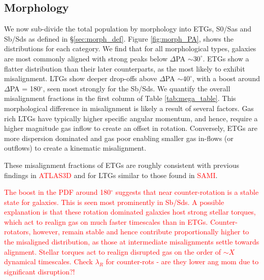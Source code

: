 \documentclass[fleqn,usenatbib]{mnras}
\newcommand{\red}[1]{{\textcolor{red}{#1}}}
\begin{document}
\subsection{Morphology}
We now sub-divide the total population by morphology into ETGs, S0/Sas and Sb/Sds as defined in \S\ref{sec:morph_def}. Figure \ref{fig:morph_PA}, shows the distributions for each category. We find that for all morphological types, galaxies are most commonly aligned with strong peaks below $\Delta$PA $\sim 30^{\circ}$. ETGs show a flatter distribution than their later counterparts, as the most likely to exhibit misalignment. LTGs show deeper drop-offs above $\Delta$PA $\sim 40^{\circ}$, with a boost around $\Delta$PA = 180$^{\circ}$, seen most strongly for the Sb/Sds. We quantify the overall misalignment fractions in the first column of Table \ref{tab:mega_table}. This morphological difference in misalignment is likely a result of several factors. Gas rich LTGs have typically higher specific angular momentum, and hence, require a higher magnitude gas inflow to create an offset in rotation. Conversely, ETGs are more dispersion dominated and gas poor enabling smaller gas in-flows (or outflows) to create a kinematic misalignment. 

These misalignment fractions of ETGs are roughly consistent with previous findings in \red{ATLAS3D} and for LTGs similar to those found in \red{SAMI}. 

\red{The boost in the PDF around 180$^{\circ}$ suggests that near counter-rotation is a stable state for galaxies. This is seen most prominently in Sb/Sds. A possible explanation is that these rotation dominated galaxies host strong stellar torques, which act to realign gas on much faster timescales than in ETGs. Counter-rotators, however, remain stable and hence contribute proportionally higher to the misaligned distribution, as those at intermediate misalignments settle towards alignment. Stellar torques act to realign disrupted gas on the order of $\sim X$ dynamical timescales. Check $\lambda_{R}$ for counter-rots - are they lower ang mom due to significant disruption?!}
\end{document}
